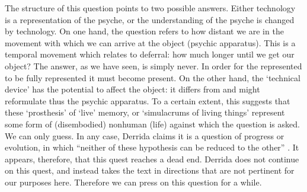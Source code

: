 The structure of this question points to two possible answers. Either technology is a representation of the psyche, or the understanding of the psyche is changed by technology. On one hand, the question refers to how distant we are in the movement with which we can arrive at the object (psychic apparatus). This is a temporal movement which relates to deferral: how much longer until we get our object? The answer, as we have seen, is simply never. In order for the represented to be fully represented it must become present. On the other hand, the `technical device' has the potential to affect the object: it differs from and might reformulate thus the psychic apparatus. To a certain extent, this suggests that these `prosthesis' of `live' memory, or `simulacrums of living things' represent some form of (disembodied) nonhuman (life) against which the question is asked. We can only guess. In any case, Derrida claims it is a question of progress or evolution, in which ``neither of these hypothesis can be reduced to the other'' \parencite[16]{Der95:Arc}. It appears, therefore, that this quest reaches a dead end. Derrida does not continue on this quest, and instead takes the text in directions that are not pertinent for our purposes here. Therefore we can press on this question for a while. 

